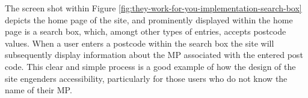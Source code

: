 The screen shot within Figure \ref{fig:they-work-for-you-implementation-search-box} depicts the home page of the site,
and prominently displayed within the home page is a search box, which, amongt other types of entries, accepts postcode \cite{postcodes-uk} values.
When a user enters a postcode within the search box the site will subsequently display information about the MP associated with the entered post code.
This clear and simple process is a good example of how the design of the site engenders accessibility,
particularly for those users who do not know the name of their MP.